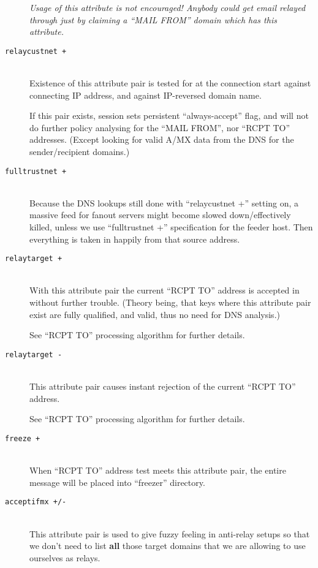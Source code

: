 \begin{description}
{\em Usage of this attribute is not encouraged!
Anybody could get email relayed through just by claiming
a ``MAIL FROM'' domain which has this attribute.}

\item[\tt relaycustnet +] \mbox{} \\
Existence of this attribute pair is tested for at the  connection
start against connecting IP address, and against IP-reversed domain name.

If this pair exists, session sets persistent ``always-accept'' flag,
and will not do further policy analysing for the ``MAIL FROM'', nor
``RCPT TO'' addresses.  (Except looking for valid A/MX data from the
DNS for the sender/recipient domains.)

\item[\tt fulltrustnet +] \mbox{} \\
Because the DNS lookups still done with ``relaycustnet +'' setting on,
a massive feed for fanout servers might become slowed down/effectively
killed, unless we use ``fulltrustnet +'' specification for the feeder
host.  Then everything is taken in happily from that source address.

\item[\tt relaytarget +] \mbox{} \\
With this attribute pair the current ``RCPT TO'' address is accepted in
without further trouble. (Theory being, that keys where this attribute
pair exist are fully qualified, and valid, thus no need for DNS analysis.)

See ``RCPT TO'' processing algorithm for further details.

\item[\tt relaytarget -] \mbox{} \\
This attribute pair causes instant rejection of the current ``RCPT TO''
address.

See ``RCPT TO'' processing algorithm for further details.

\item[\tt freeze +] \mbox{} \\
When ``RCPT TO'' address test meets this attribute pair, the entire
message will be placed into ``freezer'' directory.

\item[\tt acceptifmx +/-] \mbox{} \\
This attribute pair is used to give fuzzy feeling in anti-relay setups
so that we don't need to list {\bf all} those target domains that we
are allowing to use ourselves as relays.


\end{description}
